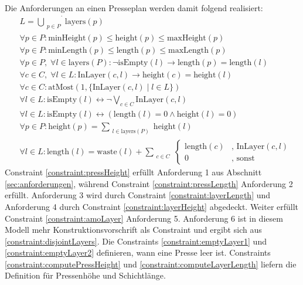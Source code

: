 Die Anforderungen an einen Presseplan werden damit folgend realisiert:
\begin{align}
    & L = \dot{\bigcup_{\substack{p \in P}}} \text{layers}(p) \label{constraint:disjointLayers} \\[10pt]
    & \forall p \in P: \text{minHeight}(p) \leq \text{height}(p) \leq \text{maxHeight}(p) \label{constraint:pressHeight} \\[10pt]
    & \forall p \in P: \text{minLength}(p) \leq \text{length}(p) \leq \text{maxLength}(p) \label{constraint:pressLength} \\[10pt]
    & \forall p \in P,\; \forall l \in \text{layers}(P): \neg \text{isEmpty}(l) \rightarrow \text{length}(p) = \text{length}(l) \label{constraint:layerLength} \\[10pt]
    & \forall c \in C,\; \forall l \in L: \text{InLayer}(c,l) \rightarrow \text{height}(c) = \text{height}(l) \label{constraint:layerHeight} \\[10pt]
    & \forall c \in C: \text{atMost}(1,\{ \text{InLayer}(c,l) \mid l \in L \}) \label{constraint:amoLayer} \\[10pt]
    & \forall l \in L: \text{isEmpty}(l) \leftrightarrow \neg\bigvee_{c \in C} \text{InLayer}(c,l) \label{constraint:emptyLayer1} \\[10pt]
    & \forall l \in L: \text{isEmpty}(l) \leftrightarrow (\text{length}(l) = 0 \land \text{height}(l) = 0) \label{constraint:emptyLayer2} \\[10pt]
    & \forall p \in P: \text{height}(p) = \sum_{\substack{l \in \text{layers}(P)}} \text{height}(l) \label{constraint:computePressHeight} \\[10pt]
    & \forall l \in L: \text{length}(l) = \text{waste}(l) + \sum_{\substack{c \in C}}
    \begin{cases}
        \text{length}(c) & \text{, } \text{InLayer}(c,l) \\
        0 & \text{, sonst}
    \end{cases} \label{constraint:computeLayerLength}
\end{align}
Constraint \ref{constraint:pressHeight} erfüllt Anforderung 1 aus Abschnitt \ref{sec:anforderungen}, während Constraint \ref{constraint:pressLength} Anforderung 2 erfüllt.
Anforderung 3 wird durch Constraint \ref{constraint:layerLength} und Anforderung 4 durch Constraint \ref{constraint:layerHeight} abgedeckt.
Weiter erfüllt Constraint \ref{constraint:amoLayer} Anforderung 5.
Anforderung 6 ist in diesem Modell mehr Konstruktionsvorschrift als Constraint und ergibt sich aus \ref{constraint:disjointLayers}.
Die Constraints \ref{constraint:emptyLayer1} und \ref{constraint:emptyLayer2} definieren, wann eine Presse leer ist.
Constraints \ref{constraint:computePressHeight} und \ref{constraint:computeLayerLength} liefern die Definition für Pressenhöhe und Schichtlänge.

